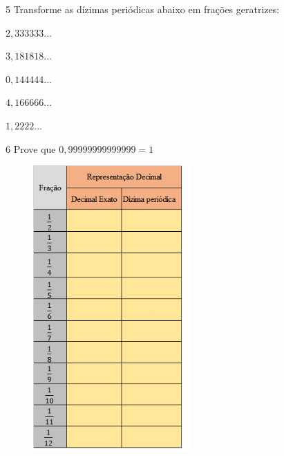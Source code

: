 \num{5} Transforme as dízimas periódicas abaixo em frações geratrizes:

\begin{escolha}
\item $2,333333...$
\item $3,181818...$
\item $0,144444...$
\item $4,166666...$
\item $1,2222...$
\end{escolha}


\num{6} Prove que $0,99999999999999 = 1$



\begin{figure}[H]%
\centering\includegraphics[width=2.37378in,height=4.29167in]{./imgSAEB_8_MAT/media/image3.png}
\end{figure}


